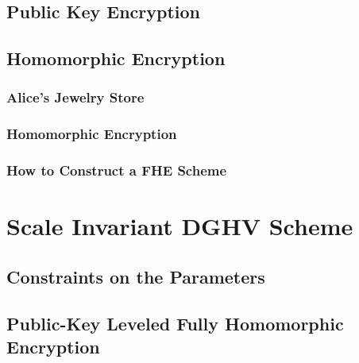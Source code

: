 \documentclass{article}
\begin{document}
\subsection{Public Key Encryption}


\subsection{Homomorphic Encryption}


\subsubsection{Alice's Jewelry Store}


\subsubsection{Homomorphic Encryption}


\subsubsection{How to Construct a FHE Scheme}



\section{Scale Invariant DGHV Scheme}



\subsection{Constraints on the Parameters}


\subsection{Public-Key Leveled Fully Homomorphic Encryption}

\end{document}
